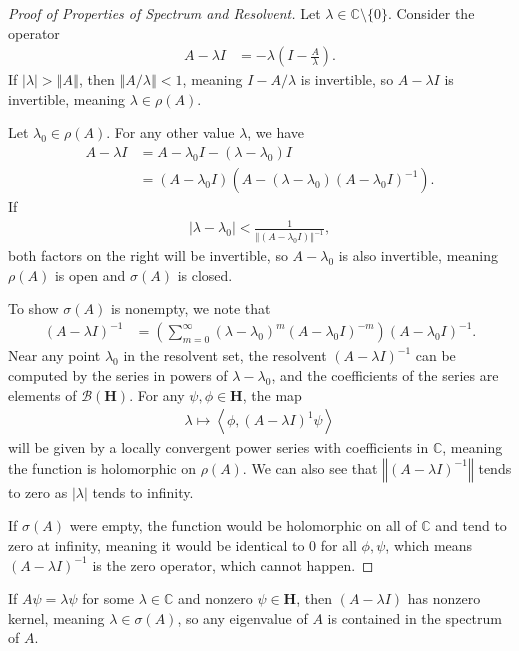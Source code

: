 \documentclass[10pt]{extarticle}
\newcommand{\C}{\mathbb{C}}
\newcommand{\iprod}[2]{\left\langle #1,#2\right\rangle}
\newcommand{\norm}[1]{\left\Vert #1\right\Vert}
\theoremstyle{plain}
\theoremstyle{definition}
\theoremstyle{remark}
\renewcommand{\newline}{\hfill\break}
\begin{document}
  \begin{proof}[Proof of Properties of Spectrum and Resolvent]
    Let $\lambda \in \C\setminus \{0\}$. Consider the operator
    \begin{align*}
      A - \lambda I &= -\lambda \left(I - \frac{A}{\lambda}\right).
    \end{align*}
    If $|\lambda| > \norm{A}$, then $\norm{A / \lambda} < 1$, meaning $I - A/\lambda$ is invertible, so $A - \lambda I$ is invertible, meaning $\lambda \in \rho(A)$.\newline

    Let $\lambda_0\in \rho(A)$. For any other value $\lambda$, we have
    \begin{align*}
      A - \lambda I &= A - \lambda_0 I - (\lambda - \lambda_0)I\\
                    &= (A-\lambda_0 I)\left(A - (\lambda - \lambda_0)(A-\lambda_0 I)^{-1}\right).
    \end{align*}
    If
    \begin{align*}
      |\lambda - \lambda_0| < \frac{1}{\norm{(A - \lambda_0 I)}^{-1}},
    \end{align*}
    both factors on the right will be invertible, so $A - \lambda_0$ is also invertible, meaning $\rho(A)$ is open and $\sigma(A)$ is closed.\newline

    To show $\sigma(A)$ is nonempty, we note that
    \begin{align*}
      \left(A - \lambda I\right)^{-1} &= \left(\sum_{m=0}^{\infty}\left(\lambda - \lambda_0\right)^m\left(A - \lambda_0 I\right)^{-m}\right)\left(A - \lambda_0 I\right)^{-1}.
    \end{align*}
    Near any point $\lambda_0$ in the resolvent set, the resolvent $(A-\lambda I)^{-1}$ can be computed by the series in powers of $\lambda - \lambda_0$, and the coefficients of the series are elements of $\mathcal{B}\left(\mathbf{H}\right)$. For any $\psi,\phi \in \mathbf{H}$, the map
    \begin{align*}
      \lambda \mapsto \iprod{\phi}{(A-\lambda I)^{1}\psi}
    \end{align*}
    will be given by a locally convergent power series with coefficients in $\C$, meaning the function is holomorphic on $\rho(A)$. We can also see that $\norm{\left(A-\lambda I\right)^{-1}}$ tends to zero as $|\lambda|$ tends to infinity.\newline

    If $\sigma(A)$ were empty, the function would be holomorphic on all of $\C$ and tend to zero at infinity, meaning it would be identical to $0$ for all $\phi,\psi$, which means $\left(A-\lambda I\right)^{-1}$ is the zero operator, which cannot happen.
  \end{proof}
  If $A\psi = \lambda \psi$ for some $\lambda \in \C$ and nonzero $\psi \in \mathbf{H}$, then $(A - \lambda I)$ has nonzero kernel, meaning $\lambda \in \sigma(A)$, so any eigenvalue of $A$ is contained in the spectrum of $A$.\newline
\end{document}
